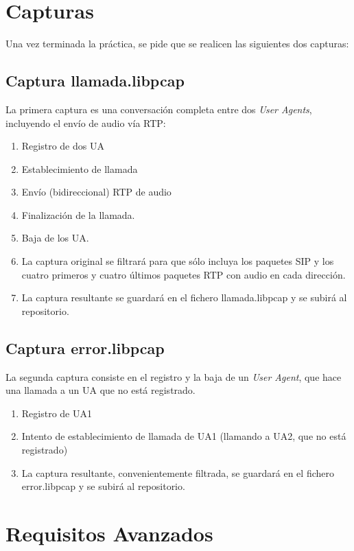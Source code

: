 \documentclass[a4paper,11pt]{article}
\begin{document}
\section{Capturas}

Una vez terminada la práctica, se pide que se realicen las 
siguientes dos capturas:

\subsection{Captura llamada.libpcap}

La primera captura es una conversación completa entre dos \emph{User Agents}, incluyendo el envío de audio vía RTP:

\begin{enumerate}
  \item Registro de dos UA
  \item Establecimiento de llamada
  \item Envío (bidireccional) RTP de audio
  \item Finalización de la llamada.
  \item Baja de los UA.
  \item La captura original se filtrará para que sólo incluya los paquetes
SIP y los cuatro primeros y cuatro últimos paquetes RTP con audio en cada dirección.
  \item La captura resultante se guardará en el fichero llamada.libpcap
y se subirá al repositorio.
\end{enumerate}

\subsection{Captura error.libpcap}

La segunda captura consiste en el registro y la baja de un \emph{User Agent}, que hace una llamada a un UA que no está registrado.

\begin{enumerate}
  \item Registro de UA1
  \item Intento de establecimiento de llamada de UA1 (llamando a UA2, que no está registrado)
  \item La captura resultante, convenientemente filtrada, se guardará en el fichero error.libpcap
y se subirá al repositorio.
\end{enumerate}

\newpage
\section{Requisitos Avanzados}
\end{document}
